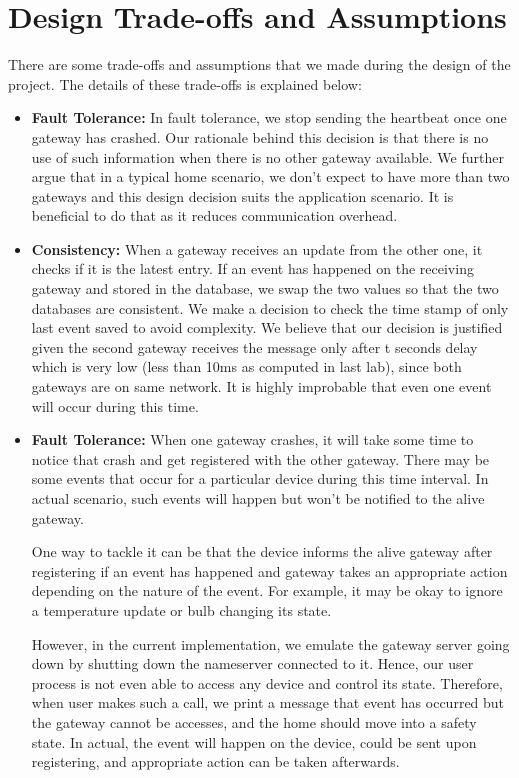 \documentclass[12pt]{article}
\begin{document}
\section{Design Trade-offs and Assumptions}



There are some trade-offs and assumptions that we made during the design 
of the project. The details of these trade-offs is explained below:

\begin{itemize}
	\item \textbf{Fault Tolerance: } In fault tolerance, we stop sending the heartbeat once 
	one gateway has crashed. Our rationale behind this decision is that there is no use of
	such information when there is no other gateway available. We further argue that in a 
	typical home scenario, we don't expect to have more than two gateways and this design 
	decision suits the application scenario. It is beneficial to do that as it reduces communication
	overhead.
	
	\item \textbf{Consistency: } When a gateway receives an update from the other one, it 
	checks if it is the latest entry. If an event has happened on the receiving gateway and stored 
	in the database, we swap the two values so that the two databases are consistent. 
	We make a decision to check the time stamp of only last event saved to avoid complexity. 
	We believe that our decision is justified given the second gateway receives the message
	only after t seconds delay which is very low (less than 10ms as computed in last lab), since both 
	gateways are on same network. It is highly improbable that even one event will occur 
	during this time.
	
	\item \textbf{Fault Tolerance: } When one gateway crashes, it will take some time to 
	notice that crash and get registered with the other gateway. There may be some events that
	occur for a particular device during this time interval. In actual scenario, such events will happen 
	but won't be notified to the alive gateway. 
	
	One way to tackle it can be that the device informs the alive gateway after registering if an event
	 has happened and gateway takes an appropriate action depending on the nature of the event. 
	 For example, it may be okay to ignore a temperature update or bulb changing its state. 
	 
	 However, in the current implementation, we emulate the gateway server going down by 
	 shutting down the nameserver connected to it. Hence, our user process is not even able to 
	 access any device and control its state. Therefore, when user makes such a call, we print 
	 a message that event has occurred but the gateway cannot be accesses, and the home should 
	 move into a safety state. In actual, the event will happen on the device, could be sent 
	 upon registering, and appropriate action can be taken afterwards. 
	 
\end{itemize}
\end{document}
